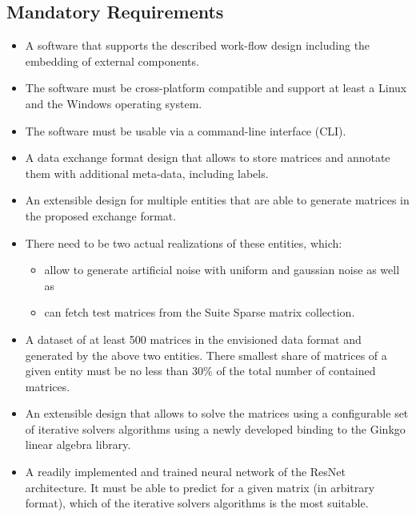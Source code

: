 \documentclass[parskip=full]{scrartcl}
\begin{document}
\subsection{Mandatory Requirements}
\begin{itemize}

\item A software that supports the described work-flow design including the embedding of external components.

\item The software must be cross-platform compatible and support at least a Linux and the Windows operating system.

\item The software must be usable via a command-line interface (CLI).

\item A data exchange format design that allows to store matrices and annotate them with 
additional meta-data, including labels.

\item An extensible design for multiple entities that are able to generate matrices in the proposed exchange format.

\item There need to be two actual realizations of these entities, which:

\begin{itemize}
    \item allow to generate artificial noise with uniform and gaussian noise as well as
    
    \item can fetch test matrices from the Suite Sparse matrix collection.
\end{itemize}

\item A dataset of at least 500 matrices in the envisioned data format and generated by the above two entities. There smallest share of matrices of a given entity must be no less than 30\% of the total number of contained matrices.

\item An extensible design that allows to solve the matrices using a configurable set of \glspl{iterative solver} algorithms using a newly developed binding to the Ginkgo linear algebra library.

\item A readily implemented and trained neural network of the ResNet architecture. It must be able to predict for a given matrix (in arbitrary format), which of the \glspl{iterative solver} algorithms is the most suitable.


\end{itemize}
\end{document}
